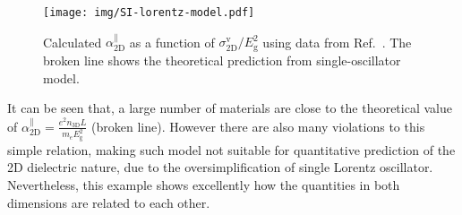 \documentclass[manuscript=suppinfo,email=true,hyperref=true,keywords=false]{achemso}
\begin{document}
\begin{figure}[htbp]
  \centering
  \texttt{[image: img/SI-lorentz-model.pdf]}
  \caption{Calculated $\alpha_{\mathrm{2D}}^{\parallel}$ as a function of
    $\sigma_{\mathrm{2D}}^{\mathrm{v}}/E_{\mathrm{g}}^{2}$ using data from Ref.~. The broken line shows the theoretical prediction
    from single-oscillator model.}
  \label{fig:plasma}
\end{figure}
It can be seen that, a large number of materials are close to the
theoretical value of
$\alpha_{\mathrm{2D}}^{\parallel} = \frac{e^{2} n_{\mathrm{3D}} L}{m_{e}
  E_{\mathrm{g}}^{2}}$ (broken line). However there are also many
violations to this simple relation, making such model not suitable for
quantitative prediction of the 2D dielectric nature, due to the
oversimplification of single Lorentz oscillator. Nevertheless, this
example shows excellently how the quantities in both dimensions are
related to each other.
\end{document}
